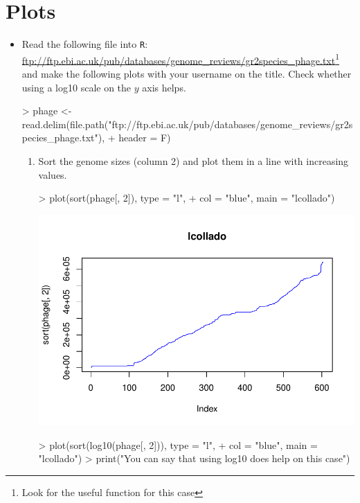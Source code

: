 \documentclass[letterpaper,12pt]{article}
\newcommand{\pl}[1]{\texttt{#1}}
\begin{document}
\section{Plots}
  \begin{itemize}
  \item Read the following file into \pl{R}: \url{ftp://ftp.ebi.ac.uk/pub/databases/genome_reviews/gr2species_phage.txt}\footnote{Look for the useful function for this case} and make the following plots with your username on the title. Check whether using a log10 scale on the $y$ axis helps.
\begin{Schunk}
\begin{Sinput}
> phage <- read.delim(file.path("ftp://ftp.ebi.ac.uk/pub/databases/genome_reviews/gr2species_phage.txt"), 
+     header = F)
\end{Sinput}
\end{Schunk}
  \begin{enumerate}
  \item Sort the genome sizes (column 2) and plot them in a line with increasing values.
\begin{Schunk}
\begin{Sinput}
> plot(sort(phage[, 2]), type = "l", 
+     col = "blue", main = "lcollado")
\end{Sinput}
\end{Schunk}
\includegraphics{plots/fig-006}
\begin{Schunk}
\begin{Sinput}
> plot(sort(log10(phage[, 2])), type = "l", 
+     col = "blue", main = "lcollado")
> print("You can say that using log10 does help on this case")
\end{Sinput}
\begin{Soutput}

\end{Soutput}
\end{Schunk}
\end{enumerate}
\end{itemize}
\end{document}
